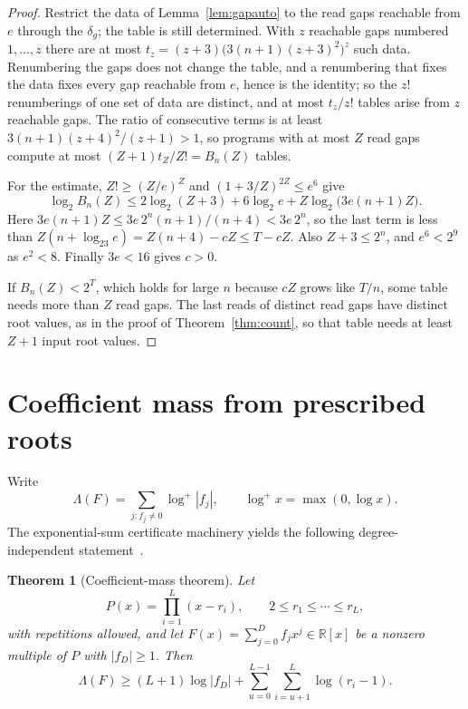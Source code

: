 \documentclass[11pt]{article}
\newtheorem{theorem}{Theorem}[section]
\theoremstyle{remark}
\newcommand{\R}{\mathbb R}
\begin{document}
\begin{proof}
Restrict the data of Lemma~\ref{lem:gapauto} to the read gaps reachable from
$e$ through the $\delta_g$; the table is still determined.  With $z$
reachable gaps numbered $1,\dots,z$ there are at most
$t_z=(z+3)\bigl(3(n+1)(z+3)^2\bigr)^z$ such data.  Renumbering the gaps
does not change the table, and a renumbering that fixes the data fixes every
gap reachable from $e$, hence is the identity; so the $z!$ renumberings of
one set of data are distinct, and at most $t_z/z!$ tables arise from $z$
reachable gaps.  The ratio of consecutive terms is at least
$3(n+1)(z+4)^2/(z+1)>1$, so programs with at most $Z$ read gaps compute at
most $(Z+1)t_Z/Z!=B_n(Z)$ tables.

For the estimate, $Z!\ge(Z/e)^Z$ and $(1+3/Z)^{2Z}\le e^6$ give
\[
  \log_2B_n(Z)\le 2\log_2(Z+3)+6\log_2e+Z\log_2\bigl(3e(n+1)Z\bigr).
\]
Here $3e(n+1)Z\le3e\,2^n(n+1)/(n+4)<3e\,2^n$, so the last term is less than
$Z(n+\log_23e)=Z(n+4)-cZ\le T-cZ$.  Also $Z+3\le2^n$, and $e^6<2^9$ as
$e^2<8$.  Finally $3e<16$ gives $c>0$.

If $B_n(Z)<2^T$, which holds for large $n$ because $cZ$ grows like $T/n$, some
table needs more than $Z$ read gaps.  The last reads of distinct read gaps
have distinct root values, as in the proof of Theorem~\ref{thm:count}, so
that table needs at least $Z+1$ input root values.
\end{proof}

\section{Coefficient mass from prescribed roots}\label{sec:mass}

Write
\[
  \Lambda(F)=\sum_{j:f_j\ne0}\log^+|f_j|,\qquad \log^+x=\max(0,\log x).
\]
The exponential-sum certificate machinery yields the following
degree-independent statement~\cite[Corollary~3.4]{coefficient-mass}.

\begin{theorem}[Coefficient-mass theorem]\label{thm:mass}
Let
\[
  P(x)=\prod_{i=1}^{L}(x-r_i),
  \qquad 2\le r_1\le\cdots\le r_L,
\]
with repetitions allowed, and let \(F(x)=\sum_{j=0}^{D}f_jx^j\in\R[x]\) be a
nonzero multiple of \(P\) with \(|f_D|\ge1\).  Then
\begin{equation}\label{eq:mass-general}
  \Lambda(F)
  \ge (L+1)\log|f_D| + \sum_{u=0}^{L-1}
       \sum_{i=u+1}^{L}\log(r_i-1).
\end{equation}
\end{theorem}
\end{document}
